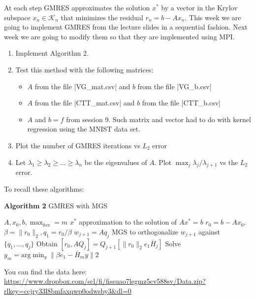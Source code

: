 \documentclass[11pt]{article}
\begin{document}
At each step GMRES approximates the solution $x^*$ by a vector in the Krylov subspace $x_n \in \mathcal{K}_n$ that minimizes the residual $r_n = b - Ax_n$. This week we are going to implement GMRES from the lecture slides in a sequential fashion. Next week we are going to modify them so that they are implemented using MPI. 

\begin{enumerate}
   \item Implement Algorithm 2.
   \item Test this method with the following matrices:
   \begin{itemize}
       \item $A$ from the file |VG_mat.csv| and $b$ from the file |VG_b.csv|
       \item $A$ from the file |CTT_mat.csv| and $b$ from the file |CTT_b.csv|
       \item $A$ and $b = f$ from session 9. Such matrix and vector had to do with kernel regression using the MNIST data set.
   \end{itemize}
   \item Plot the number of GMRES iterations vs $L_2$ error
   \item Let $\lambda_1 \geq \lambda_2 \geq ... \geq \lambda_n$ be the eigenvalues of $A$. Plot $\max_{j}\lambda_j/\lambda_{j+1}$ vs the $L_2$ error.
\end{enumerate}


To recall these algorithms:

\scriptsize
\begin{algorithm}
\caption{\textbf{Algorithm 2} GMRES with MGS}\label{GMRES - MGS}
\begin{algorithmic}
\Input $A, x_0, b, \max_{\text{iter}} = m$
\Output $x^*$ approximation to the solution of $Ax^* = b$
\State $r_0 = b - Ax_0$, $\beta = \|r_0\|_2, q_1 = r_0/\beta$
    \State $w_{j+1} = Aq_j$
    \State MGS to orthogonalize $w_{j+1}$ against $\{q_1, ..., q_j\}$
    \State Obtain $[r_0, AQ_j] = Q_{j+1}[\|r_0\|_2 e_1 \bar{H}_j]$
\EndFor
\State Solve $y_m = \text{arg}\min_{y} \| \beta e_1 - \bar{H}_m y \|2$
\end{algorithmic}
\end{algorithm}
\normalsize

You can find the data here: \url{https://www.dropbox.com/scl/fi/fissuao7legmz5cv588sv/Data.zip?rlkey=ccjry33l8bmfaxqwp0odwsby3&dl=0}
\end{document}
